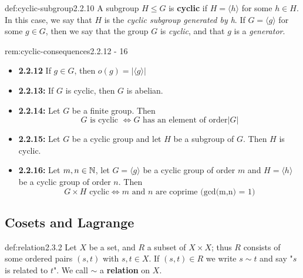 \documentclass[landscape, 8pt]{extarticle}
\begin{document}
\begin{multicols}{3}
\begin{dfn}{def:cyclic-subgroup}{2.2.10}
    A subgroup $H\le G$ is \textbf{cyclic} if $H = \langle h \rangle$ for some $h\in H$. In this case, we say that $H$ is the \textit{cyclic subgroup generated by h}. If $G=\langle g \rangle$ for some $g\in G$, then we say that the group $G$ is \textit{cyclic}, and that $g$ is a \textit{generator}.
\end{dfn}
\vspace{-5pt}

\begin{rem}{rem:cyclic-consequences}{2.2.12 - 16}
    \renewcommand\labelitemi{\tiny$\bullet$}
    \begin{itemize}
        \setlength\itemsep{0em}
        \item \textbf{2.2.12} If $g\in G$, then $o(g)=\lvert \langle g \rangle \rvert$
        \item \textbf{2.2.13:} If $G$ is cyclic, then $G$ is abelian.
        \item \textbf{2.2.14:} Let $G$ be a finite group. Then
        \[G \text{ is cyclic } \iff G \text{ has an element of order} \lvert  G\rvert \]
        \item \textbf{2.2.15:} Let $G$ be a cyclic group and let $H$ be a subgroup of $G$. Then $H$ is cyclic.
        \item \textbf{2.2.16:} Let $m,n\in \mathbb{N}$, let $G=\langle g \rangle$ be a cyclic group of order $m$ and $H=\langle h \rangle$ be a cyclic group of order $n$. Then
        $$G \times H \text{ cyclic} \iff m \text{ and } n \text{ are coprime (gcd(m,n) = 1)}$$
    \end{itemize}
\end{rem}
\vspace{-5pt}


\subsection*{Cosets and Lagrange}

\begin{dfn}[Relation]{def:relation}{2.3.2}
    Let $X$ be a set, and $R$ a subset of $X\times X$; thus $R$ consists of some ordered pairs $(s,t)$ with $s,t\in X$. If $(s,t) \in R$ we write $s \sim t$ and say "$s$ is related to $t$". We call $\sim$ a \textbf{relation} on $X$.
\end{dfn}
\vspace{-5pt}


\end{multicols}
\end{document}
